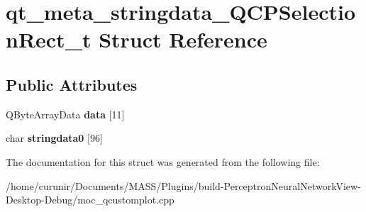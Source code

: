 \hypertarget{structqt__meta__stringdata___q_c_p_selection_rect__t}{}\section{qt\+\_\+meta\+\_\+stringdata\+\_\+\+Q\+C\+P\+Selection\+Rect\+\_\+t Struct Reference}
\label{structqt__meta__stringdata___q_c_p_selection_rect__t}
\subsection*{Public Attributes}
\begin{DoxyCompactItemize}
\item 
Q\+Byte\+Array\+Data {\bfseries data} \mbox{[}11\mbox{]}\hypertarget{structqt__meta__stringdata___q_c_p_selection_rect__t_aa58583b159c4713d8ea71032fddcc13f}{}\label{structqt__meta__stringdata___q_c_p_selection_rect__t_aa58583b159c4713d8ea71032fddcc13f}

\item 
char {\bfseries stringdata0} \mbox{[}96\mbox{]}\hypertarget{structqt__meta__stringdata___q_c_p_selection_rect__t_a39a87de1040c403f0ba00fdaedecbb79}{}\label{structqt__meta__stringdata___q_c_p_selection_rect__t_a39a87de1040c403f0ba00fdaedecbb79}

\end{DoxyCompactItemize}


The documentation for this struct was generated from the following file\+:\begin{DoxyCompactItemize}
\item 
/home/curunir/\+Documents/\+M\+A\+S\+S/\+Plugins/build-\/\+Perceptron\+Neural\+Network\+View-\/\+Desktop-\/\+Debug/moc\+\_\+qcustomplot.\+cpp\end{DoxyCompactItemize}
